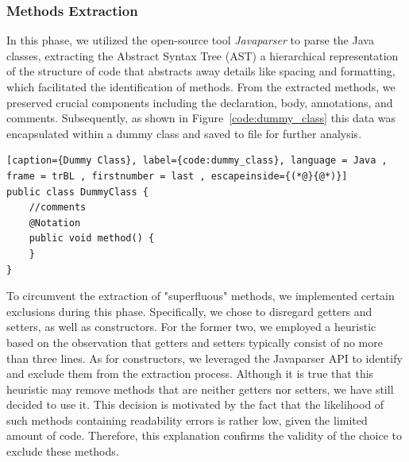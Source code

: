 \subsubsection{Methods Extraction} %
In this phase, we utilized the open-source tool \textit{Javaparser} to parse the Java classes, extracting the Abstract Syntax Tree (AST) a hierarchical representation of the structure of code that abstracts away details like spacing and formatting, which facilitated the identification of methods. From the extracted methods, we preserved crucial components including the declaration, body, annotations, and comments. Subsequently, as shown in Figure~\ref{code:dummy_class} this data was encapsulated within a dummy class and saved to file for further analysis.\newpage
\begin{lstlisting}[caption={Dummy Class}, label={code:dummy_class}, language = Java , frame = trBL , firstnumber = last , escapeinside={(*@}{@*)}]
public class DummyClass {
    //comments
    @Notation
    public void method() {
    }
}
\end{lstlisting}
To circumvent the extraction of "superfluous" methods, we implemented certain exclusions during this phase. Specifically, we chose to disregard getters and setters, as well as constructors. For the former two, we employed a heuristic based on the observation that getters and setters typically consist of no more than three lines. As for constructors, we leveraged the Javaparser API to identify and exclude them from the extraction process.
Although it is true that this heuristic may remove methods that are neither getters nor setters, we have still decided to use it. This decision is motivated by the fact that the likelihood of such methods containing readability errors is rather low, given the limited amount of code. Therefore, this explanation confirms the validity of the choice to exclude these methods.



